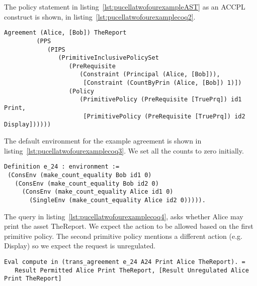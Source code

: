 The policy statement in listing~\ref{lst:pucellatwofourexampleAST} as an \ac{ACCPL} construct is shown, in listing~\ref{lst:pucellatwofourexamplecoq2}.

\begin{minipage}[c]{0.95\textwidth}
\begin{lstlisting}
Agreement (Alice, [Bob]) TheReport
         (PPS
            (PIPS
               (PrimitiveInclusivePolicySet
                  (PreRequisite
                     (Constraint (Principal (Alice, [Bob])),
                      [Constraint (CountByPrin (Alice, [Bob]) 1)])
                  (Policy
                     (PrimitivePolicy (PreRequisite [TruePrq]) id1 Print,
                      [PrimitivePolicy (PreRequisite [TruePrq]) id2 Display])))))

\end{lstlisting}
\end{minipage} 

The default environment for the example agreement is shown in listing~\ref{lst:pucellatwofourexamplecoq3}. We set all the counts to zero initially.

\begin{minipage}[c]{0.95\textwidth}
\begin{lstlisting}
Definition e_24 : environment :=
 (ConsEnv (make_count_equality Bob id1 0)
   (ConsEnv (make_count_equality Bob id2 0)
     (ConsEnv (make_count_equality Alice id1 0)
       (SingleEnv (make_count_equality Alice id2 0))))).
\end{lstlisting}
\end{minipage} 

The query in listing~\ref{lst:pucellatwofourexamplecoq4}, asks whether Alice may print the asset TheReport. We expect the action to be allowed based on the first primitive policy. The second primitive policy mentions a different action (e.g. Display) so we expect the request is unregulated. 

\begin{minipage}[c]{0.95\textwidth}
\begin{lstlisting}
Eval compute in (trans_agreement e_24 A24 Print Alice TheReport). = 
   Result Permitted Alice Print TheReport, [Result Unregulated Alice Print TheReport]
\end{lstlisting}
\end{minipage} 

